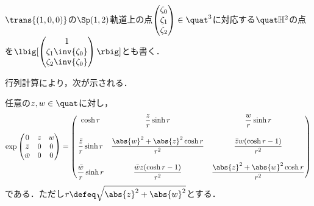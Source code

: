 \begin{nttdef}
  $\trans{(1,0,0)} $の$\Sp(1,2)$軌道上の点$
  \begin{pmatrix}
    \zeta_0 \\ \zeta_1 \\ \zeta_2 
  \end{pmatrix}
  \in \quat^3 $に対応する$\quat\mathbb{H}^2$の点を$\lbig[
  \begin{pmatrix}
    1 \\ \zeta_1\inv{\zeta_0} \\ \zeta_2 \inv{\zeta_0}
  \end{pmatrix}\rbig]
  $とも書く．
  
\end{nttdef}

行列計算により，次が示される．
\begin{lem}\label{lem:exp-quat}
  
  任意の$ z,w\in \quat$に対し，
  \begin{align*}
    \exp
    \begin{pmatrix}
      0 & z & w  \\
      \bar{z} & 0 & 0\\
      \bar{w} & 0 & 0
    \end{pmatrix}
                    =
                    \begin{pmatrix}
                      \cosh r &  \dfrac{z}{r} \sinh r & \dfrac{w}{r}\sinh r \\
                      \\
                      \dfrac{\bar{z}}{r} \sinh r & \dfrac{\abs{w}^2 + \abs{z}^2\cosh r}{r^2}  & \dfrac{\bar{z}w(\cosh r -1)}{r^2} \\
                      \\
                      \dfrac{\bar{w}}{r}\sinh r &  \dfrac{\bar{w}z(\cosh r -1)}{r^2} & \dfrac{\abs{z}^2 + \abs{w}^2\cosh r}{r^2} 
                    \end{pmatrix}
  \end{align*}
  である．ただし$r \defeq \sqrt{\abs{z}^2 + \abs{w}^2 } $とする．
\end{lem}


